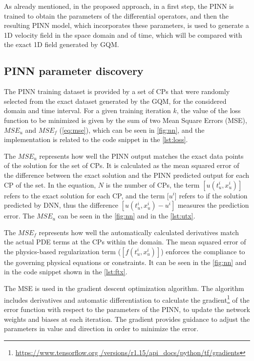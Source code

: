 \documentclass[conference]{IEEEtran}
\begin{document}
As already mentioned, in the proposed approach, in a first step, the PINN is trained to obtain the parameters of the differential operators, and then the resulting PINN model, which incorporates these parameters, is used to generate a 1D velocity field in the space domain and of time, which will be compared with the exact 1D field generated by GQM.


\subsection{PINN parameter discovery}
\label{sec:ppd}




The PINN training dataset is provided by a set of CPs that were randomly selected from the exact dataset generated by the GQM, for the considered domain and time interval. For a given training iteration $k$, the value of the loss function to be minimized is given by the sum of two Mean Square Errors (MSE),
$MSE_u$ and $MSE_f$ (\autoref{eq:mse}), which can be seen in \autoref{fig:nn}, and the implementation is related to the code snippet in the \autoref{lst:loss}.

The $MSE_{u}$ represents how well the PINN output matches the exact data points of the solution for the set of CPs. It is calculated as the mean squared error of the difference between the exact solution and the PINN predicted output for each CP of the set. In the equation, $N$ is the number of CPs, the term $[u(t^i_u, x^i_u)]$ refers to the exact solution for each CP, and the term [$u^i$] refers to if the solution predicted by DNN, thus the difference $[u(t^i_u, x^i_u)-u^i]$ measures the prediction error. 
The $MSE_{u}$ can be seen in the \autoref{fig:nn} and in the \autoref{lst:utx}.

The $MSE_f$ represents how well the automatically calculated derivatives  match the actual PDE terms at the CPs within the domain. The mean squared error of the physics-based regularization term ($[f(t^i_u, x^i_u)]$) enforces the compliance to the governing physical equations or constraints.
It can be seen in the \autoref{fig:nn} and in the code snippet shown in the \autoref{lst:ftx}.

The MSE is used in the gradient descent optimization algorithm. The algorithm includes derivatives and automatic differentiation \cite{Baydin2018} to calculate the gradient\footnote{\url{https://www.tensorflow.org /versions/r1.15/api_docs/python/tf/gradients}} of the error function with respect to the parameters of the PINN, to update the network weights and biases at each iteration. The gradient provides guidance to adjust the parameters in value and direction in order to minimize the error.
\end{document}
